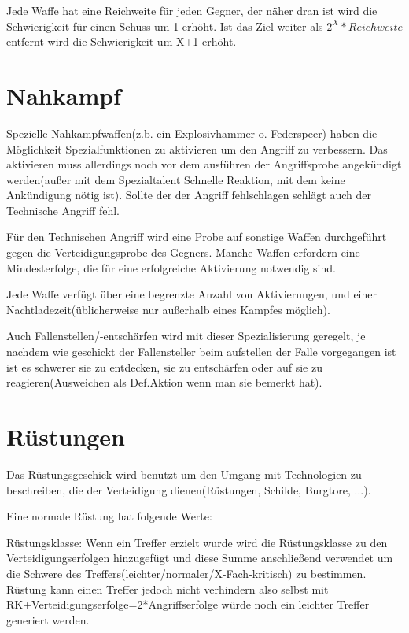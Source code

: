 Jede Waffe hat eine Reichweite für jeden Gegner, der näher dran ist wird die Schwierigkeit für einen Schuss um 1 erhöht. Ist das Ziel weiter als $2^X*Reichweite$ entfernt wird die Schwierigkeit um X+1 erhöht.

\section{Nahkampf}

Spezielle Nahkampfwaffen(z.b. ein Explosivhammer o. Federspeer) haben die Möglichkeit Spezialfunktionen zu aktivieren um den Angriff zu verbessern. Das aktivieren muss allerdings noch vor dem ausführen der Angriffsprobe angekündigt werden(außer mit dem Spezialtalent Schnelle Reaktion, mit dem keine Ankündigung nötig ist). Sollte der der Angriff fehlschlagen schlägt auch der Technische Angriff fehl.

Für den Technischen Angriff wird eine Probe auf sonstige Waffen durchgeführt gegen die Verteidigungsprobe des Gegners. Manche Waffen erfordern eine Mindesterfolge, die für eine erfolgreiche Aktivierung notwendig sind.

Jede Waffe verfügt über eine begrenzte Anzahl von Aktivierungen, und einer Nachtladezeit(üblicherweise nur außerhalb eines Kampfes möglich).

Auch Fallenstellen/-entschärfen wird mit dieser Spezialisierung geregelt, je nachdem wie geschickt der Fallensteller beim aufstellen der Falle vorgegangen ist ist es schwerer sie zu entdecken, sie zu entschärfen oder auf sie zu reagieren(Ausweichen als Def.Aktion wenn man sie bemerkt hat).

\section{Rüstungen}

Das Rüstungsgeschick wird benutzt um den Umgang mit Technologien zu beschreiben, die der Verteidigung dienen(Rüstungen, Schilde, Burgtore, ...).

Eine normale Rüstung hat folgende Werte:

Rüstungsklasse: Wenn ein Treffer erzielt wurde wird die Rüstungsklasse zu den Verteidigungserfolgen hinzugefügt und diese Summe anschließend verwendet um die Schwere des Treffers(leichter/normaler/X-Fach-kritisch) zu bestimmen. Rüstung kann einen Treffer jedoch nicht verhindern also selbst mit RK+Verteidigungserfolge=2*Angriffserfolge würde noch ein leichter Treffer generiert werden.

